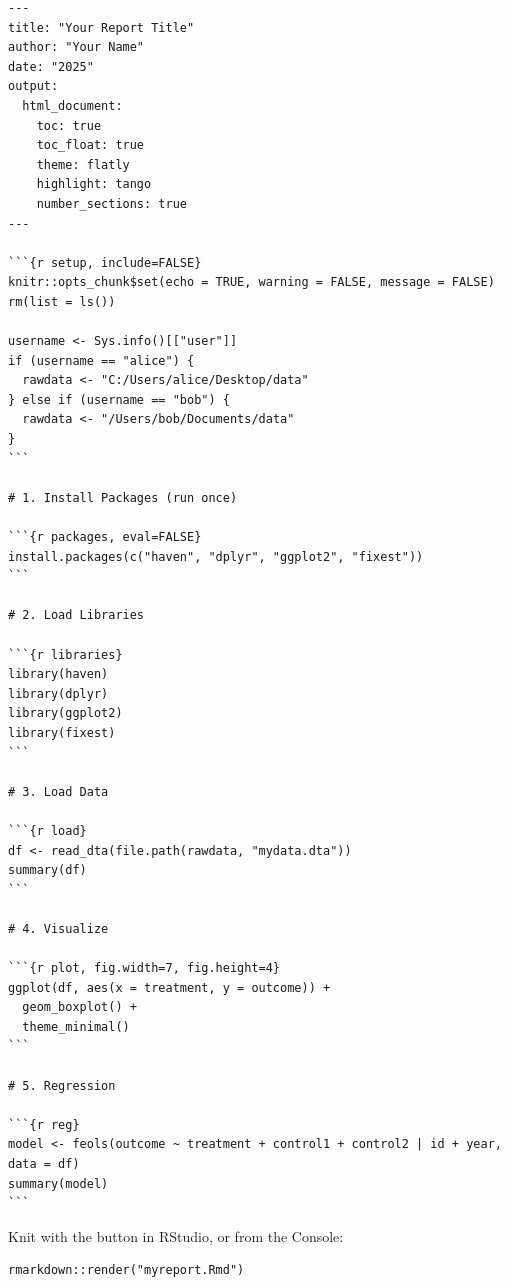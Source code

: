 \documentclass[paper=a4, fontsize=11pt]{scrartcl}
\begin{document}
\begin{lstlisting}[style=yaml]
---
title: "Your Report Title"
author: "Your Name"
date: "2025"
output:
  html_document:
    toc: true
    toc_float: true
    theme: flatly
    highlight: tango
    number_sections: true
---

```{r setup, include=FALSE}
knitr::opts_chunk$set(echo = TRUE, warning = FALSE, message = FALSE)
rm(list = ls())

username <- Sys.info()[["user"]]
if (username == "alice") {
  rawdata <- "C:/Users/alice/Desktop/data"
} else if (username == "bob") {
  rawdata <- "/Users/bob/Documents/data"
}
```

# 1. Install Packages (run once)

```{r packages, eval=FALSE}
install.packages(c("haven", "dplyr", "ggplot2", "fixest"))
```

# 2. Load Libraries

```{r libraries}
library(haven)
library(dplyr)
library(ggplot2)
library(fixest)
```

# 3. Load Data

```{r load}
df <- read_dta(file.path(rawdata, "mydata.dta"))
summary(df)
```

# 4. Visualize

```{r plot, fig.width=7, fig.height=4}
ggplot(df, aes(x = treatment, y = outcome)) +
  geom_boxplot() +
  theme_minimal()
```

# 5. Regression

```{r reg}
model <- feols(outcome ~ treatment + control1 + control2 | id + year, data = df)
summary(model)
```
\end{lstlisting}

\medskip
Knit with the button in RStudio, or from the Console:

\begin{lstlisting}[style=rcode]
rmarkdown::render("myreport.Rmd")
\end{lstlisting}
\end{document}
